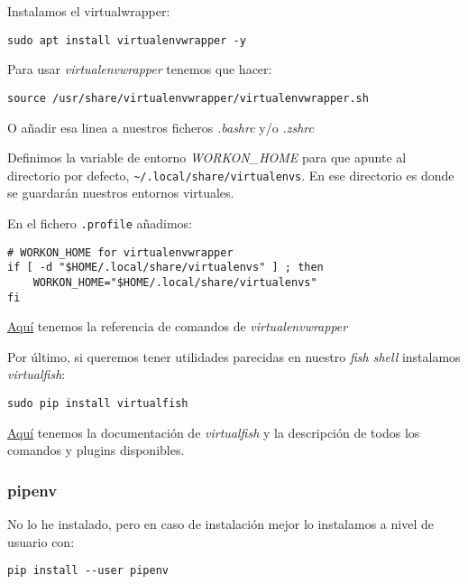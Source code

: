 \documentclass[
  12pt,
  spanish,
]{article}
\begin{document}
Instalamos el virtualwrapper:

\begin{verbatim}
sudo apt install virtualenvwrapper -y
\end{verbatim}

Para usar \emph{virtualenvwrapper} tenemos que hacer:

\begin{verbatim}
source /usr/share/virtualenvwrapper/virtualenvwrapper.sh
\end{verbatim}

O añadir esa linea a nuestros ficheros \emph{.bashrc} y/o \emph{.zshrc}

Definimos la variable de entorno \emph{WORKON\_HOME} para que apunte al
directorio por defecto,
\texttt{\textasciitilde{}/.local/share/virtualenvs}. En ese directorio
es donde se guardarán nuestros entornos virtuales.

En el fichero \texttt{.profile} añadimos:

\begin{verbatim}
# WORKON_HOME for virtualenvwrapper
if [ -d "$HOME/.local/share/virtualenvs" ] ; then
    WORKON_HOME="$HOME/.local/share/virtualenvs"
fi
\end{verbatim}

\href{http://virtualenvwrapper.readthedocs.io/en/latest/command_ref.html}{Aquí}
tenemos la referencia de comandos de \emph{virtualenvwrapper}

Por último, si queremos tener utilidades parecidas en nuestro \emph{fish
shell} instalamos \emph{virtualfish}:

\begin{verbatim}
sudo pip install virtualfish
\end{verbatim}

\href{http://virtualfish.readthedocs.io/en/latest/index.html}{Aquí}
tenemos la documentación de \emph{virtualfish} y la descripción de todos
los comandos y plugins disponibles.

\hypertarget{pipenv}{%
\subsubsection{pipenv}\label{pipenv}}

No lo he instalado, pero en caso de instalación mejor lo instalamos a
nivel de usuario con:

\begin{verbatim}
pip install --user pipenv
\end{verbatim}
\end{document}
